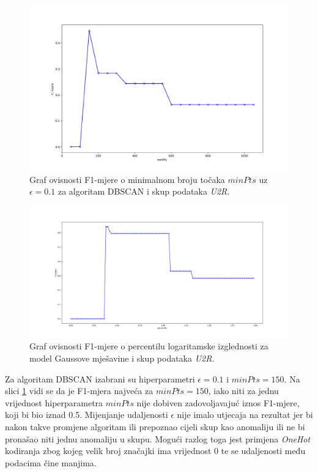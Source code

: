 \documentclass[utf8, diplomski, numeric]{fer}
\begin{document}
\begin{figure}[h!]
\includegraphics[width=1\textwidth]{images/u2r-dbscan-f1.png}
\centering
\caption{Graf ovisnosti F1-mjere o minimalnom broju točaka $minPts$ uz $\epsilon = 0.1$ za algoritam DBSCAN i skup podataka \textit{U2R}.}
\label{fig:u2r-dbscan}
\end{figure}

\begin{figure}[h!]
\includegraphics[width=1\textwidth]{images/u2r-gauss-f1.png}
\centering
\caption{Graf ovisnosti F1-mjere o percentilu logaritamske izglednosti za model Gaussove mješavine i skup podataka \textit{U2R}.}
\label{fig:u2r-gauss}
\end{figure}

Za algoritam DBSCAN izabrani su hiperparametri $\epsilon = 0.1$ i $minPts = 150$. Na slici \ref{fig:u2r-dbscan} vidi se da je F1-mjera najveća za $minPts = 150$, iako niti za jednu vrijednost hiperparametra $minPts$ nije dobiven zadovoljavajuć iznos F1-mjere, koji bi bio iznad 0.5. Mijenjanje udaljenosti $\epsilon$ nije imalo utjecaja na rezultat jer bi nakon takve promjene algoritam ili prepoznao cijeli skup kao anomaliju ili ne bi pronašao niti jednu anomaliju u skupu. Mogući razlog toga jest primjena \textit{OneHot} kodiranja zbog kojeg velik broj značajki ima vrijednost 0 te se udaljenosti među podacima čine manjima.
\end{document}
